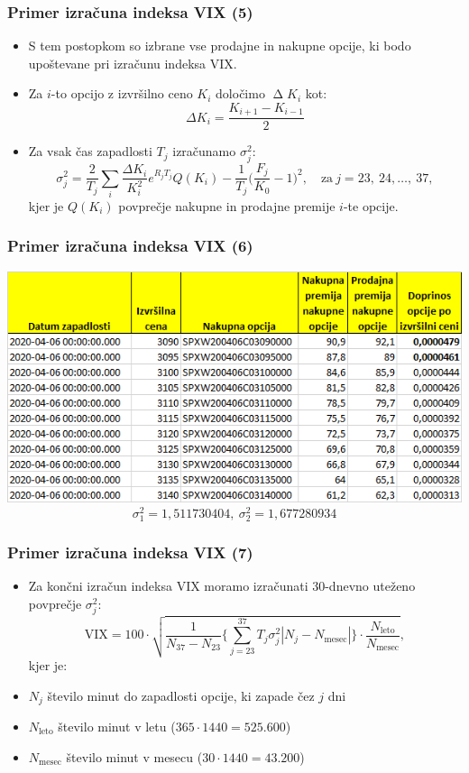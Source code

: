 \documentclass[10pt]{beamer}
\begin{document}
\begin{frame}
\frametitle{Primer izračuna indeksa VIX (5)}
\begin{itemize}
\item S tem postopkom so izbrane vse prodajne in nakupne opcije, ki bodo upoštevane pri izračunu indeksa VIX.\\

\item Za $i$-to opcijo z  izvršilno ceno $K_i$ določimo $\operatorname{\Delta}K_i$ kot:
$$
\Delta K_i = \frac{K_{i+1} - K_{i-1}}{2}
$$
\item Za vsak čas zapadlosti $T_j$ izračunamo $\sigma_j^2$:
$$
\sigma_j^2 = \frac{2}{T_j}\sum_{i}{}\frac{\Delta K_i}{K_i^2}e^{R_jT_j}Q(K_i) - \frac{1}{T_j}\bigg(\frac{F_j}{K_0} - 1\bigg)^2, \quad \text{za}\  j = {23,\ 24, \dots,\ 37},
$$
kjer je $Q(K_i)$ povprečje nakupne in prodajne premije $i$-te opcije.
\end{itemize}
\end{frame}


\begin{frame}
\frametitle{Primer izračuna indeksa VIX (6)}
\includegraphics[width=1\textwidth]{./Grafi/Option_contribution.png}
$$
\sigma_1^2 = 1,511730404,\ \sigma_2^2 = 1,677280934
$$

\end{frame}


\begin{frame}
\frametitle{Primer izračuna indeksa VIX (7)}
\begin{itemize}
\item Za končni izračun indeksa VIX moramo izračunati 30-dnevno uteženo povprečje $\sigma_j^2$:
$$
\text{VIX} = 100 \cdot \sqrt{\frac{1}{N_{37}-N_{23}}\Bigg\{ \sum_{j=23}^{37}T_j\sigma_j^2\left\lvert N_j - N_{\text{mesec}}\right\rvert \Bigg\}\cdot \frac{N_\text{{leto}}}{N_{\text{mesec}}}},
$$
kjer je:
\item $N_j$ število minut do zapadlosti opcije, ki zapade čez $j$ dni
\item $N_{\text{leto}}$ število minut v letu ($365\cdot1440=525.600$)
\item $N_{\text{mesec}}$ število minut v mesecu ($30\cdot1440=43.200$)
\end{itemize}

\end{frame}
\end{document}
